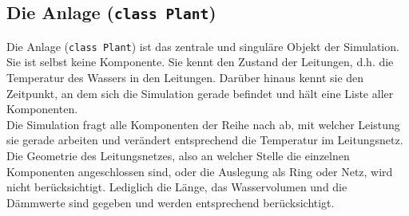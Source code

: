 \documentclass[12pt,a4paper]{article}
\begin{document}
\subsection{Die Anlage (\texttt{class Plant})}
Die Anlage (\texttt{class Plant}) ist das zentrale und singuläre Objekt der Simulation. Sie ist selbst keine Komponente. Sie kennt den Zustand der Leitungen, d.h. die Temperatur des Wassers in den Leitungen. Darüber hinaus kennt sie den Zeitpunkt, an dem sich die Simulation gerade befindet und hält eine Liste aller Komponenten.\\
Die Simulation fragt alle Komponenten der Reihe nach ab, mit welcher Leistung sie gerade arbeiten und verändert entsprechend die Temperatur im Leitungsnetz. Die Geometrie des Leitungsnetzes, also an welcher Stelle die einzelnen Komponenten angeschlossen sind, oder die Auslegung als Ring oder Netz, wird nicht berücksichtigt. Lediglich die Länge, das Wasservolumen und die Dämmwerte sind gegeben und werden entsprechend berücksichtigt.
\end{document}

